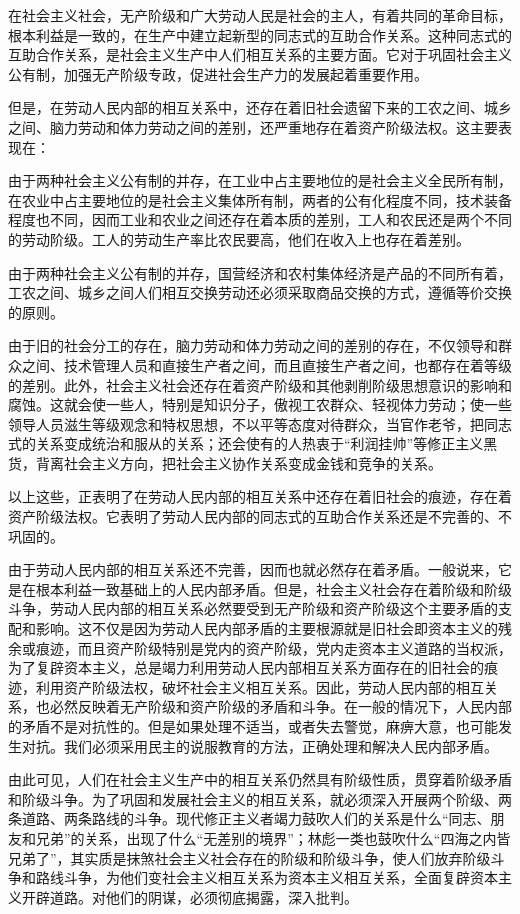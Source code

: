 \documentclass{book}
\begin{document}
在社会主义社会，无产阶级和广大劳动人民是社会的主人，有着共同的革命目标，根本利益是一致的，在生产中建立起新型的同志式的互助合作关系。这种同志式的互助合作关系，是社会主义生产中人们相互关系的主要方面。它对于巩固社会主义公有制，加强无产阶级专政，促进社会生产力的发展起着重要作用。

但是，在劳动人民内部的相互关系中，还存在着旧社会遗留下来的工农之间、城乡之间、脑力劳动和体力劳动之间的差别，还严重地存在着资产阶级法权。这主要表现在：

由于两种社会主义公有制的并存，在工业中占主要地位的是社会主义全民所有制，在农业中占主要地位的是社会主义集体所有制，两者的公有化程度不同，技术装备程度也不同，因而工业和农业之间还存在着本质的差别，工人和农民还是两个不同的劳动阶级。工人的劳动生产率比农民要高，他们在收入上也存在着差别。

由于两种社会主义公有制的并存，国营经济和农村集体经济是产品的不同所有着，工农之间、城乡之间人们相互交换劳动还必须采取商品交换的方式，遵循等价交换的原则。

由于旧的社会分工的存在，脑力劳动和体力劳动之间的差别的存在，不仅领导和群众之间、技术管理人员和直接生产者之间，而且直接生产者之间，也都存在着等级的差别。此外，社会主义社会还存在着资产阶级和其他剥削阶级思想意识的影响和腐蚀。这就会使一些人，特别是知识分子，傲视工农群众、轻视体力劳动；使一些领导人员滋生等级观念和特权思想，不以平等态度对待群众，当官作老爷，把同志式的关系变成统治和服从的关系；还会使有的人热衷于“利润挂帅”等修正主义黑货，背离社会主义方向，把社会主义协作关系变成金钱和竞争的关系。

以上这些，正表明了在劳动人民内部的相互关系中还存在着旧社会的痕迹，存在着资产阶级法权。它表明了劳动人民内部的同志式的互助合作关系还是不完善的、不巩固的。

由于劳动人民内部的相互关系还不完善，因而也就必然存在着矛盾。一般说来，它是在根本利益一致基础上的人民内部矛盾。但是，社会主义社会存在着阶级和阶级斗争，劳动人民内部的相互关系必然要受到无产阶级和资产阶级这个主要矛盾的支配和影响。这不仅是因为劳动人民内部矛盾的主要根源就是旧社会即资本主义的残余或痕迹，而且资产阶级特别是党内的资产阶级，党内走资本主义道路的当权派，为了复辟资本主义，总是竭力利用劳动人民内部相互关系方面存在的旧社会的痕迹，利用资产阶级法权，破坏社会主义相互关系。因此，劳动人民内部的相互关系，也必然反映着无产阶级和资产阶级的矛盾和斗争。在一般的情况下，人民内部的矛盾不是对抗性的。但是如果处理不适当，或者失去警觉，麻痹大意，也可能发生对抗。我们必须采用民主的说服教育的方法，正确处理和解决人民内部矛盾。

由此可见，人们在社会主义生产中的相互关系仍然具有阶级性质，贯穿着阶级矛盾和阶级斗争。为了巩固和发展社会主义的相互关系，就必须深入开展两个阶级、两条道路、两条路线的斗争。现代修正主义者竭力鼓吹人们的关系是什么“同志、朋友和兄弟”的关系，出现了什么“无差别的境界”；林彪一类也鼓吹什么“四海之内皆兄弟了”，其实质是抹煞社会主义社会存在的阶级和阶级斗争，使人们放弃阶级斗争和路线斗争，为他们变社会主义相互关系为资本主义相互关系，全面复辟资本主义开辟道路。对他们的阴谋，必须彻底揭露，深入批判。
\end{document}
